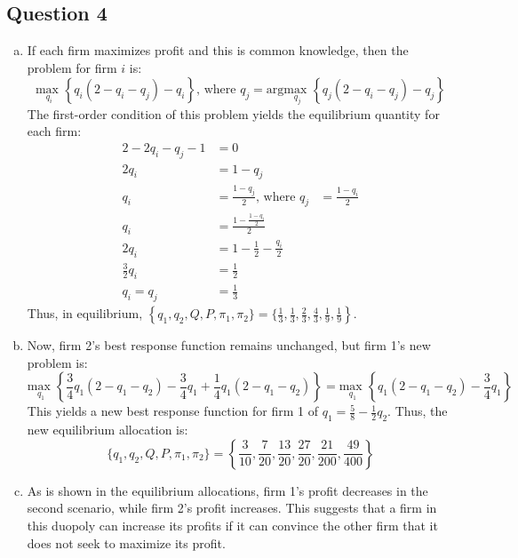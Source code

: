 \documentclass{article}
\newcommand{\usmax}[1]{\underset{#1}{\text{max }}}
\begin{document}
\pagebreak
\subsection*{Question 4}

\begin{enumerate}[(a)]
	\item If each firm maximizes profit and this is common knowledge, then the problem for firm $i$ is:
		\[
			\usmax{q_i}\left\{q_i\left(2-q_i-q_j\right) - q_i\right\}\text{, where }q_j = \text{arg}\usmax{q_j}\left\{q_j\left(2-q_i-q_j\right) - q_j\right\}
		\]
		The first-order condition of this problem yields the equilibrium quantity for each firm:
		\begin{align*}
			2-2q_i - q_j -1 &= 0	\\
			2q_i &= 1-q_j 	\\
			q_i &= \frac{1-q_j}{2}\text{, where } q_j &= \frac{1-q_i}{2}	\\
			q_i &= \frac{1-\frac{1-q_i}{2}}{2} \\
			2q_i &= 1-\frac{1}{2}-\frac{q_i}{2}	\\
			\frac{3}{2}q_i &= \frac{1}{2}	\\
			q_i = q_j &= \frac{1}{3}
		\end{align*}
		Thus, in equilibrium, ${\left\{q_1,q_2,Q,P,\pi_1,\pi_2\}=\{\frac{1}{3},\frac{1}{3},\frac{2}{3},\frac{4}{3},\frac{1}{9},\frac{1}{9}\right\}}$.
	
	\item Now, firm 2's best response function remains unchanged, but firm 1's new problem is:
		\[
			\usmax{q_1}\left\{\frac{3}{4}q_1\left(2-q_1-q_2\right) - \frac{3}{4}q_1 + \frac{1}{4}q_1\left(2-q_1-q_2\right)\right\} =
			\usmax{q_1}\left\{q_1\left(2-q_1-q_2\right) - \frac{3}{4}q_1\right\}
		\]
		This yields a new best response function for firm 1 of ${q_1 = \frac{5}{8}-\frac{1}{2}q_2}$. Thus, the new equilibrium allocation is:
		\[
			\{q_1,q_2,Q,P,\pi_1,\pi_2\}=\left\{\frac{3}{10},\frac{7}{20},\frac{13}{20},\frac{27}{20},\frac{21}{200},\frac{49}{400}\right\}
		\]
	
	\item As is shown in the equilibrium allocations, firm 1's profit decreases in the second scenario, while firm 2's profit increases. This suggests that a firm in this duopoly can increase its profits if it can convince the other firm that it does not seek to maximize its profit.
\end{enumerate}
\end{document}
